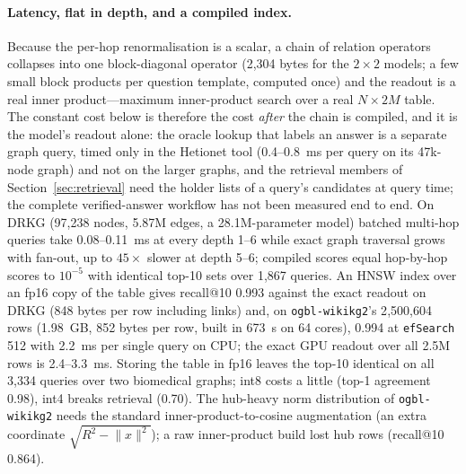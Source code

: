 \documentclass[11pt,a4paper]{article}
\begin{document}
\paragraph{Latency, flat in depth, and a compiled index.} Because the
per-hop renormalisation is a scalar, a chain of relation operators
collapses into one block-diagonal operator (2{,}304 bytes for the
$2\times2$ models; a few small block products per question template,
computed once) and the readout is a real inner product---maximum
inner-product search over a real $N\times2M$ table. The constant cost
below is therefore the cost \emph{after} the chain is compiled, and it
is the model's readout alone: the oracle lookup that labels an answer
is a separate graph query, timed only in the Hetionet tool (0.4--0.8~ms
per query on its 47k-node graph) and not on the larger graphs, and the
retrieval members of Section~\ref{sec:retrieval} need the holder lists
of a query's candidates at query time; the complete verified-answer
workflow has not been measured end to end. On DRKG
\citep{ioannidis2020drkg} (97{,}238 nodes, 5.87M edges, a 28.1M-parameter
model) batched multi-hop queries take 0.08--0.11~ms at every depth 1--6
while exact graph traversal grows with fan-out, up to $45\times$ slower at
depth 5--6; compiled scores equal hop-by-hop scores to $10^{-5}$ with
identical top-10 sets over 1{,}867 queries. An HNSW index
\citep{malkov2018hnsw,johnson2019faiss} over an fp16 copy of the table
gives recall@10 0.993 against the exact readout on DRKG (848 bytes per
row including links) and, on \texttt{ogbl-wikikg2}'s 2{,}500{,}604 rows
(1.98~GB, 852 bytes per row, built in 673~s on 64 cores), 0.994 at
\texttt{efSearch} 512 with 2.2~ms per single query on CPU; the exact GPU
readout over all 2.5M rows is 2.4--3.3~ms. Storing the table in fp16
leaves the top-10 identical on all 3{,}334 queries over two biomedical
graphs; int8 costs a little (top-1 agreement 0.98), int4 breaks retrieval
(0.70). The hub-heavy norm distribution of \texttt{ogbl-wikikg2} needs
the standard inner-product-to-cosine augmentation (an extra coordinate
$\sqrt{R^2-\lVert x\rVert^2}$); a raw inner-product build lost hub rows
(recall@10 0.864).
\end{document}
